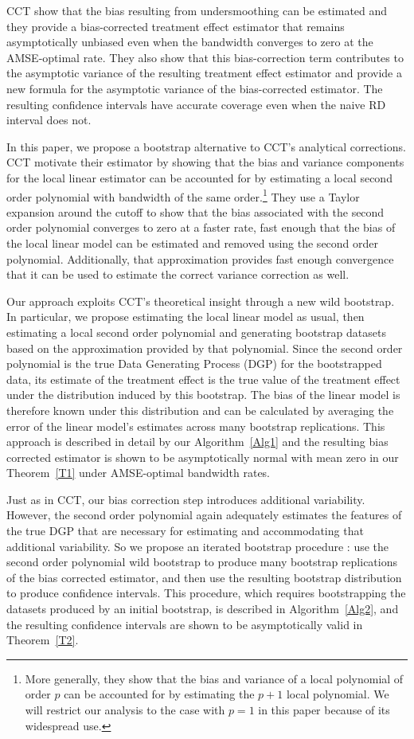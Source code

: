 \documentclass[12pt,fleqn]{article}
\begin{document}
CCT show that the bias resulting from undersmoothing can be estimated and they
provide a bias-corrected treatment effect estimator that remains
asymptotically unbiased even when the bandwidth converges to zero at the
AMSE-optimal rate. They also show that this bias-correction term contributes
to the asymptotic variance of the resulting treatment effect estimator and
provide a new formula for the asymptotic variance of the bias-corrected
estimator. The resulting confidence intervals have accurate coverage even when
the naive RD interval does not.

In this paper, we propose a bootstrap alternative to CCT's analytical
corrections. CCT motivate their estimator by showing that the bias and
variance components for the local linear estimator can be accounted for by
estimating a local second order polynomial with bandwidth of the same
order.\footnote{%
  More generally, they show that the bias and variance of a local polynomial
  of order $p$ can be accounted for by estimating the $p+1$ local
  polynomial. We will restrict our analysis to the case with $p = 1$ in this
  paper because of its widespread use.} %
They use a Taylor expansion around the cutoff to show that the bias associated
with the second order polynomial converges to zero at a faster rate, fast
enough that the bias of the local linear model can be estimated and removed
using the second order polynomial. Additionally, that approximation provides
fast enough convergence that it can be used to estimate the correct variance
correction as well.

Our approach exploits CCT's theoretical insight through a new wild
bootstrap. In particular, we propose estimating the local linear model as usual,
then estimating a local second order polynomial and generating bootstrap
datasets based on the approximation provided by that polynomial. Since the second order
polynomial is the true Data Generating Process (DGP) for the bootstrapped data,
its estimate of the treatment effect is the true value of the treatment effect
under the distribution induced by this bootstrap. The bias of the linear model
is therefore known
under this distribution and can be calculated by averaging the error of the
linear model's estimates across many bootstrap replications. This approach is
described in detail by our Algorithm~\ref{Alg1} and the resulting bias corrected
estimator is shown to be asymptotically normal with mean zero in our
Theorem~\ref{T1} under AMSE-optimal bandwidth rates.

Just as in CCT, our bias correction step introduces additional
variability. However, the second order polynomial again adequately estimates the
features of the true DGP that are necessary for estimating and accommodating that
additional variability. So we propose
an iterated bootstrap procedure \citep{hall1988}: use the second order
polynomial wild bootstrap to produce many bootstrap replications of the bias
corrected estimator, and then use the resulting bootstrap distribution to
produce confidence intervals. This procedure, which requires bootstrapping the
datasets produced by an initial bootstrap, is described in Algorithm~\ref{Alg2}, and the resulting confidence intervals are shown to be asymptotically valid in Theorem~\ref{T2}.
\end{document}
